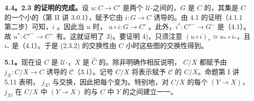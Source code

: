 \textbf{4.4。2.3 的证明的完成。}设 $u:C\to C'$ 是两个 $\mathcal U$-之间的，$G$ 是 $C$ 的，其集是 $C$ 的一个小的（第 II 讲 3.0.1），赋予它由 $i:G\to C$ 诱导的。由 4.1 的证明（4.1.1 第二步）可知，$i$ 。因此当 $u$ 时， $u\circ i:G\to C'$ 。此外，$i^*:C'^{\sim}\to G^{\sim}$ 是（4.1）。故 $u^*:C'^{\sim}\to C^{\sim}$ 有。这就证明了 3)。要证明 4)，只须注意 $(u\circ i)_*\simeq u_*\circ i_*$，且 $i_*$ 是（4.1）。于是 (2.3.2) 的交换性由 $C$ 小时这些图的交换性得到。

\textbf{5.1。}现在设 $C$ 是 $\mathcal U$-，$X$ 是 $\widehat C$ 的。除非明确作相反说明， $C/X$ 都赋予由 $j_X:C/X\to C$ 诱导的 $\mathscr C$（3.1）。记号 $C/X$ 将表示赋予 $\mathscr C$ 的 $C/X$。命题第 I 讲 5.11 表明， $j_{X!}$ 与交换，因此把每个变为。特别地，对 $C/X$ 的每个 $(Y\to X)$， $j_{X!}$ 在 $C/X$ 中 $(Y\to X)$ 的与 $C$ 中 $Y$ 的之间建立一一。

